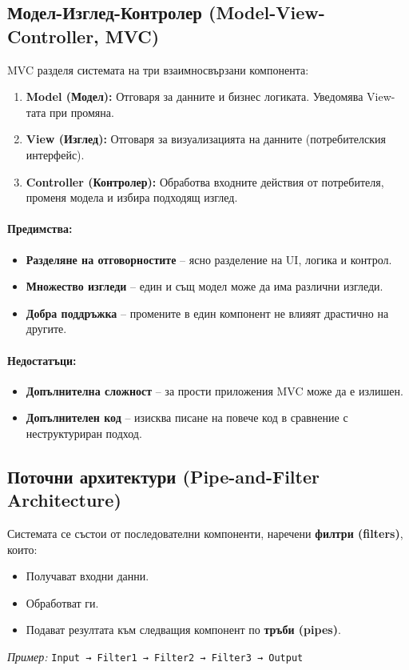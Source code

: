 \documentclass{scrartcl}
\begin{document}
\begin{FlushLeft}
\subsection{Модел-Изглед-Контролер (Model-View-Controller, MVC)}

MVC разделя системата на три взаимносвързани компонента:
\begin{enumerate}
    \item \textbf{Model (Модел):} Отговаря за данните и бизнес логиката. Уведомява View-тата при промяна.
    \item \textbf{View (Изглед):} Отговаря за визуализацията на данните (потребителския интерфейс).
    \item \textbf{Controller (Контролер):} Обработва входните действия от потребителя, променя модела и избира подходящ изглед.
\end{enumerate}

\paragraph{Предимства:}
\begin{itemize}
    \item \textbf{Разделяне на отговорностите} – ясно разделение на UI, логика и контрол.
    \item \textbf{Множество изгледи} – един и същ модел може да има различни изгледи.
    \item \textbf{Добра поддръжка} – промените в един компонент не влияят драстично на другите.
\end{itemize}

\paragraph{Недостатъци:}
\begin{itemize}
    \item \textbf{Допълнителна сложност} – за прости приложения MVC може да е излишен.
    \item \textbf{Допълнителен код} – изисква писане на повече код в сравнение с неструктуриран подход.
\end{itemize}

\subsection{Поточни архитектури (Pipe-and-Filter Architecture)}

Системата се състои от последователни компоненти, наречени \textbf{филтри (filters)}, които:
\begin{itemize}
    \item Получават входни данни.
    \item Обработват ги.
    \item Подават резултата към следващия компонент по \textbf{тръби (pipes)}.
\end{itemize}
\textit{Пример:} \texttt{Input → Filter1 → Filter2 → Filter3 → Output}


\end{FlushLeft}
\end{document}
